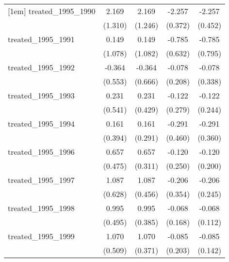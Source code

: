{\begin{tabular}{l*{4}{c}}
[1em]
treated\_1995\_1990&       2.169         &       2.169         &      -2.257\sym{***}&      -2.257\sym{***}\\
            &     (1.310)         &     (1.246)         &     (0.372)         &     (0.452)         \\
[1em]
treated\_1995\_1991&       0.149         &       0.149         &      -0.785         &      -0.785         \\
            &     (1.078)         &     (1.082)         &     (0.632)         &     (0.795)         \\
[1em]
treated\_1995\_1992&      -0.364         &      -0.364         &      -0.078         &      -0.078         \\
            &     (0.553)         &     (0.666)         &     (0.208)         &     (0.338)         \\
[1em]
treated\_1995\_1993&       0.231         &       0.231         &      -0.122         &      -0.122         \\
            &     (0.541)         &     (0.429)         &     (0.279)         &     (0.244)         \\
[1em]
treated\_1995\_1994&       0.161         &       0.161         &      -0.291         &      -0.291         \\
            &     (0.394)         &     (0.291)         &     (0.460)         &     (0.360)         \\
[1em]
treated\_1995\_1996&       0.657         &       0.657\sym{*}  &      -0.120         &      -0.120         \\
            &     (0.475)         &     (0.311)         &     (0.250)         &     (0.200)         \\
[1em]
treated\_1995\_1997&       1.087         &       1.087\sym{*}  &      -0.206         &      -0.206         \\
            &     (0.628)         &     (0.456)         &     (0.354)         &     (0.245)         \\
[1em]
treated\_1995\_1998&       0.995\sym{*}  &       0.995\sym{**} &      -0.068         &      -0.068         \\
            &     (0.495)         &     (0.385)         &     (0.168)         &     (0.112)         \\
[1em]
treated\_1995\_1999&       1.070\sym{*}  &       1.070\sym{**} &      -0.085         &      -0.085         \\
            &     (0.509)         &     (0.371)         &     (0.203)         &     (0.142)         \\

\end{tabular}}
